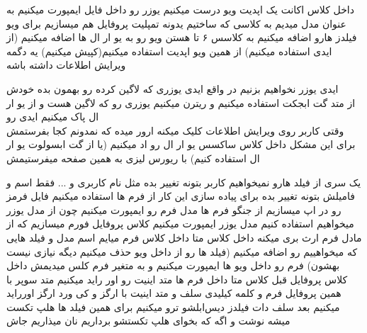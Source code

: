 \documentclass{article}
\begin{document}
			 داخل کلاس اکانت یک اپدیت ویو درست میکنیم
			 یوزر رو داخل فایل ایمپورت میکنیم به عنوان مدل میدیم به کلاسی که ساختیم یدونه تمپلیت پروفایل هم میسازیم برای ویو
			 فیلدز هارو اضافه میکنیم به کلاسس ۶ تا هستن
			 ویو رو به یو ار ال ها اضافه میکنیم (از ایدی استفاده میکنیم)
			 از همین ویو اپدیت استفاده میکنیم(کپیش میکنیم) یه دگمه ویرایش اطلاعات داشته باشه
			
		
		
		 ایدی یوزر نخواهیم بزنیم در واقع ایدی یوزری که لاگین کرده رو بهمون بده خودش \\
		از متد گت ابجکت استفاده میکنیم و ریترن میکنیم یوزری رو که لاگین هست و از یو ار ال پاک میکنیم ایدی رو\\
		
		 وقتی کاربر روی ویرایش اطلاعات کلیک میکنه ارور میده که نمدونم کجا بفرستمش برای این مشکل داخل کلاس ساکسس یو ار ال
		رو اد میکنیم (یا از گت ابسولوت یو ار ال استفاده کنیم) با ریورس لیزی به همین صفحه میفرستیمش
		
	
		 یک سری از فیلد هارو نمیخواهیم کاربر بتونه تغییر بده مثل نام کاربری و ... فقط اسم و فامیلش بتونه تغییر بده برای 
		پیاده سازی این کار از فرم ها استفاده میکنیم 
			 فایل فرمز رو در اپ میسازیم
			 از جنگو فرم ها مدل فرم رو ایمپورت میکنیم چون از مدل یوزر میخواهیم استفاده کنیم
			 مدل یوزر ایمپورت میکنیم 
			 کلاس پروفایل فورم میسازیم که از مادل فرم ارث بری میکنه
			 داخل کلاس متا داخل کلاس فرم میایم اسم مدل و فیلد هایی که میخواهییم رو اضافه میکنیم (فیلد ها رو از داخل ویو حذف میکنیم
			دیگه نیازی نیست بهشون)
			 فرم رو داخل ویو ها ایمپورت میکنیم و به متغیر فرم کلس میدیمش داخل کلاس پروفایل
			 قبل کلاس متا داخل فرم ها متد اینیت رو اور راید میکنیم
			 متد سوپر با همین پروفایل فرم و کلمه کیلیدی سلف و متد اینیت با ارگز و کی ورد ارگز اورراید میکنیم
			 بعد سلف دات فیلدز دیس‌ابلشو ترو میکنیم
			 برای همین فیلد ها هلپ تکست میشه نوشت و اگه که بخوای هلپ تکستشو برداریم نان میذاریم جاش
\end{document}
